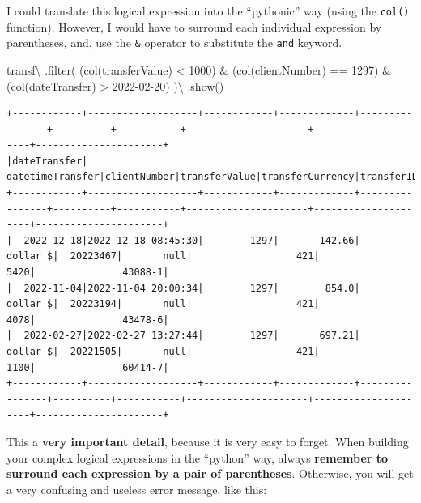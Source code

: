 \documentclass[
  11pt,
  letterpaper,
  DIV=11,
  numbers=noendperiod]{scrreprt}
\newenvironment{Shaded}{\begin{snugshade}}{\end{snugshade}}
\newcommand{\BuiltInTok}[1]{\textcolor[rgb]{0.00,0.23,0.31}{#1}}
\newcommand{\DecValTok}[1]{\textcolor[rgb]{0.68,0.00,0.00}{#1}}
\newcommand{\NormalTok}[1]{\textcolor[rgb]{0.00,0.23,0.31}{#1}}
\newcommand{\OperatorTok}[1]{\textcolor[rgb]{0.37,0.37,0.37}{#1}}
\newcommand{\StringTok}[1]{\textcolor[rgb]{0.13,0.47,0.30}{#1}}
\begin{document}
I could translate this logical expression into the ``pythonic'' way
(using the \texttt{col()} function). However, I would have to surround
each individual expression by parentheses, and, use the \texttt{\&}
operator to substitute the \texttt{and} keyword.

\begin{Shaded}
\begin{Highlighting}[]
\NormalTok{transf}\OperatorTok{\textbackslash{}}
\NormalTok{  .}\BuiltInTok{filter}\NormalTok{(}
\NormalTok{    (col(}\StringTok{\textquotesingle{}transferValue\textquotesingle{}}\NormalTok{) }\OperatorTok{\textless{}} \DecValTok{1000}\NormalTok{) }\OperatorTok{\&}
\NormalTok{    (col(}\StringTok{\textquotesingle{}clientNumber\textquotesingle{}}\NormalTok{) }\OperatorTok{==} \DecValTok{1297}\NormalTok{) }\OperatorTok{\&}
\NormalTok{    (col(}\StringTok{\textquotesingle{}dateTransfer\textquotesingle{}}\NormalTok{) }\OperatorTok{\textgreater{}} \StringTok{\textquotesingle{}2022{-}02{-}20\textquotesingle{}}\NormalTok{)}
\NormalTok{  )}\OperatorTok{\textbackslash{}}
\NormalTok{  .show()}
\end{Highlighting}
\end{Shaded}

\begin{verbatim}
+------------+-------------------+------------+-------------+----------------+----------+-----------+---------------------+---------------------+----------------------+
|dateTransfer|   datetimeTransfer|clientNumber|transferValue|transferCurrency|transferID|transferLog|destinationBankNumber|destinationBankBranch|destinationBankAccount|
+------------+-------------------+------------+-------------+----------------+----------+-----------+---------------------+---------------------+----------------------+
|  2022-12-18|2022-12-18 08:45:30|        1297|       142.66|        dollar $|  20223467|       null|                  421|                 5420|               43088-1|
|  2022-11-04|2022-11-04 20:00:34|        1297|        854.0|        dollar $|  20223194|       null|                  421|                 4078|               43478-6|
|  2022-02-27|2022-02-27 13:27:44|        1297|       697.21|        dollar $|  20221505|       null|                  421|                 1100|               60414-7|
+------------+-------------------+------------+-------------+----------------+----------+-----------+---------------------+---------------------+----------------------+
\end{verbatim}

This a \textbf{very important detail}, because it is very easy to
forget. When building your complex logical expressions in the ``python''
way, always \textbf{remember to surround each expression by a pair of
parentheses}. Otherwise, you will get a very confusing and useless error
message, like this:
\end{document}
